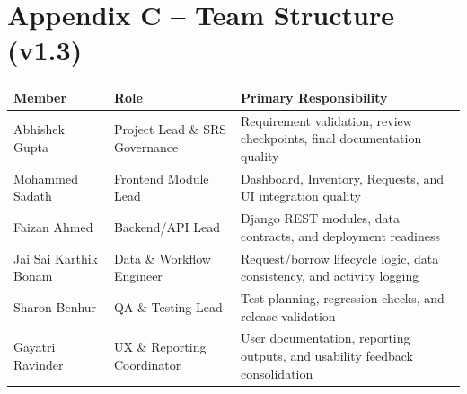 \documentclass[12pt]{article}
\begin{document}
\section*{Appendix C -- Team Structure (v1.3)}

\begin{center}
\begin{tabular}{|l|p{4.5cm}|p{5.5cm}|}
\hline
\textbf{Member} & \textbf{Role} & \textbf{Primary Responsibility} \\
\hline
Abhishek Gupta & Project Lead \& SRS Governance & Requirement validation, review checkpoints, final documentation quality \\
\hline
Mohammed Sadath & Frontend Module Lead & Dashboard, Inventory, Requests, and UI integration quality \\
\hline
Faizan Ahmed & Backend/API Lead & Django REST modules, data contracts, and deployment readiness \\
\hline
Jai Sai Karthik Bonam & Data \& Workflow Engineer & Request/borrow lifecycle logic, data consistency, and activity logging \\
\hline
Sharon Benhur & QA \& Testing Lead & Test planning, regression checks, and release validation \\
\hline
Gayatri Ravinder & UX \& Reporting Coordinator & User documentation, reporting outputs, and usability feedback consolidation \\
\hline
\end{tabular}
\end{center}
\end{document}
